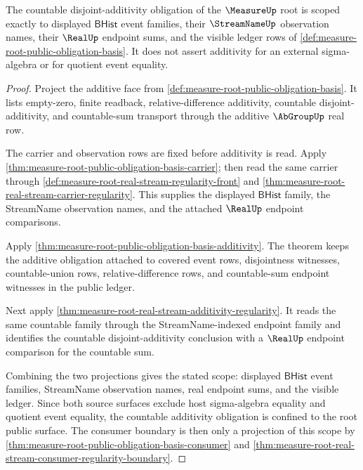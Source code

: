 \begin{theorem}
\label{thm:measure-root-countable-additivity-scope}
The countable disjoint-additivity obligation of the $\MeasureUp$ root is
scoped exactly to displayed $\mathsf{BHist}$ event families, their
$\StreamNameUp$ observation names, their $\RealUp$ endpoint sums, and the
visible ledger rows of \autoref{def:measure-root-public-obligation-basis}.
It does not assert additivity for an external sigma-algebra or for quotient
event equality.
\end{theorem}
\begin{proof}
Project the additive face from
\autoref{def:measure-root-public-obligation-basis}. It lists empty-zero,
finite readback, relative-difference additivity, countable
disjoint-additivity, and countable-sum transport through the additive
$\AbGroupUp$ real row.

The carrier and observation rows are fixed before additivity is read. Apply
\autoref{thm:measure-root-public-obligation-basis-carrier}; then read the
same carrier through \autoref{def:measure-root-real-stream-regularity-front}
and \autoref{thm:measure-root-real-stream-carrier-regularity}. This supplies
the displayed $\mathsf{BHist}$ family, the StreamName observation names, and
the attached $\RealUp$ endpoint comparisons.

Apply \autoref{thm:measure-root-public-obligation-basis-additivity}. The
theorem keeps the additive obligation attached to covered event rows,
disjointness witnesses, countable-union rows, relative-difference rows, and
countable-sum endpoint witnesses in the public ledger.

Next apply
\autoref{thm:measure-root-real-stream-additivity-regularity}. It reads the
same countable family through the StreamName-indexed endpoint family and
identifies the countable disjoint-additivity conclusion with a $\RealUp$
endpoint comparison for the countable sum.

Combining the two projections gives the stated scope: displayed
$\mathsf{BHist}$ event families, StreamName observation names, real endpoint
sums, and the visible ledger. Since both source surfaces exclude host
sigma-algebra equality and quotient event equality, the countable
additivity obligation is confined to the root public surface. The consumer
boundary is then only a projection of this scope by
\autoref{thm:measure-root-public-obligation-basis-consumer} and
\autoref{thm:measure-root-real-stream-consumer-regularity-boundary}.
\end{proof}

